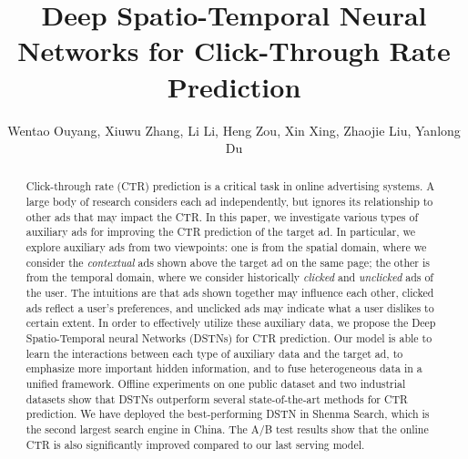 \documentclass[sigconf]{acmart}
\begin{document}
\title{Deep Spatio-Temporal Neural Networks for Click-Through Rate Prediction}
\author{Wentao Ouyang, Xiuwu Zhang, Li Li, Heng Zou, Xin Xing, Zhaojie Liu, Yanlong Du}

\begin{abstract}
Click-through rate (CTR) prediction is a critical task in online advertising systems. A large body of research considers each ad independently, but ignores its relationship to other ads that may impact the CTR. In this paper, we investigate various types of auxiliary ads for improving the CTR prediction of the target ad. In particular, we explore auxiliary ads from two viewpoints: one is from the spatial domain, where we consider the \emph{contextual} ads shown above the target ad on the same page; the other is from the temporal domain, where we consider historically \emph{clicked} and \emph{unclicked} ads of the user. The intuitions are that ads shown together may influence each other, clicked ads reflect a user's preferences, and unclicked ads may indicate what a user dislikes to certain extent. In order to effectively utilize these auxiliary data, we propose the Deep Spatio-Temporal neural Networks (DSTNs) for CTR prediction. Our model is able to learn the interactions between each type of auxiliary data and the target ad, to emphasize more important hidden information, and to fuse heterogeneous data in a unified framework. Offline experiments on one public dataset and two industrial datasets show that DSTNs outperform several state-of-the-art methods for CTR prediction. We have deployed the best-performing DSTN in Shenma Search, which is the second largest search engine in China. The A/B test results show that the online CTR is also significantly improved compared to our last serving model.
\end{abstract}



\end{document}
